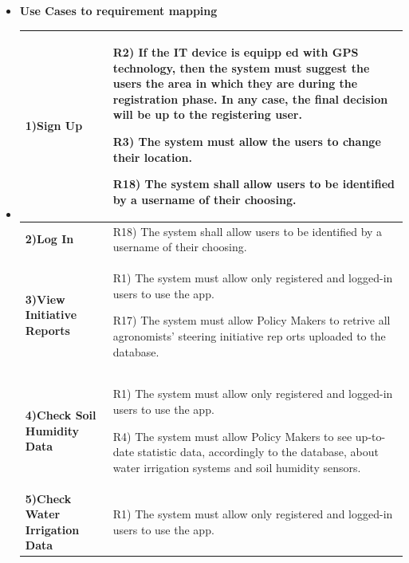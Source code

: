 \documentclass[table, 12pt]{article}
\begin{document}
\begin{itemize}
        
        \newpage

        \item \textbf{Use Cases to requirement mapping}
        
        \item[] \begin{longtable}{|p{}|p{}|}
                    \hline
                    \cellcolor{SpringGreen!50}\textbf{1)Sign Up}\centering & R2) If the IT device is equipp ed with GPS technology, then the system must suggest the users the area in which they are during the registration phase. In any case, the final decision will be up to the registering user.

                                                                     R3) The system must allow the users to change their location.
                                                                     
                                                                     R18) The system shall allow users to be identified by a username of their choosing.\\\hline
                    \cellcolor{SpringGreen!50}\textbf{2)Log In}\centering & R18) The system shall allow users to be identified by a username of their choosing. \\\hline
                    \cellcolor{SpringGreen!50}\textbf{3)View Initiative Reports}\centering &  R1) The system must allow only registered and logged-in users to use the app.

                                                                                     R17) The system must allow Policy Makers to retrive all agronomists' steering initiative rep orts uploaded to the database.\\\hline
                    \cellcolor{SpringGreen!50}\textbf{4)Check Soil Humidity Data}\centering &  R1) The system must allow only registered and logged-in users to use the app.

                                                                                                                             R4) The system must allow Policy Makers to see up-to-date statistic data, accordingly to the database, about water irrigation systems and soil humidity sensors.\\\hline
                    \cellcolor{SpringGreen!50}\textbf{5)Check Water Irrigation Data}\centering &  R1) The system must allow only registered and logged-in users to use the app.


\end{longtable}
\end{itemize}
\end{document}
